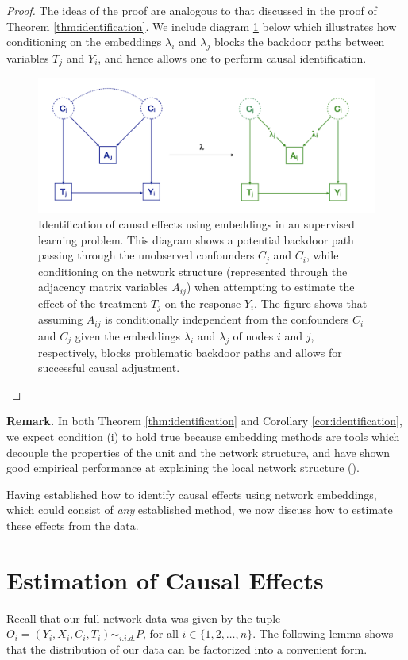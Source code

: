 \documentclass{article}
\begin{document}
\begin{proof}
The ideas of the proof are analogous to that discussed in the proof of Theorem \ref{thm:identification}. We include diagram \ref{fig:case2} below which illustrates how conditioning on the embeddings $\lambda_i$ and $
\lambda_j$ blocks the backdoor paths between  variables $T_j$ and $Y_i$, and hence allows one to perform causal identification. 

\begin{figure}
  \includegraphics[width=\linewidth]{case2.png}
  \caption{Identification of causal effects using embeddings in an supervised learning problem. This diagram shows a potential backdoor path passing through the unobserved confounders $C_j$ and $C_i$, while conditioning on the network structure (represented through the adjacency matrix variables $A_{ij}$) when attempting to estimate the effect of the treatment $T_j$ on the response $Y_i$. The figure shows that assuming $A_{ij}$ is conditionally independent from the confounders $C_i$ and $C_j$ given the embeddings $\lambda_i$ and $\lambda_j$ of nodes $i$ and $j$, respectively, blocks problematic backdoor paths and allows for successful causal adjustment.}
  \label{fig:case2}
\end{figure}
\end{proof}

\textbf{Remark.} In both Theorem \ref{thm:identification} and Corollary \ref{cor:identification}, we expect condition (i) to hold true because embedding methods are tools which decouple the properties of the unit and the network structure, and have shown good empirical performance at explaining the local network structure (\cite{Hamilton:Ying:Leskovec:2018}). 

Having established how to identify causal effects using network embeddings, which could consist of \textit{any} established method, we now discuss how to estimate these effects from the data. 


\section{Estimation of Causal Effects}
\label{sec:estimation}
Recall that our full network data was given by the tuple $O_i = (Y_i, X_i, C_i, T_i) \sim_{i.i.d.} P$, for all $i \in \{1, 2, \hdots, n\}$. The following lemma shows that the distribution of our data can be factorized into a convenient form. 
\end{document}
